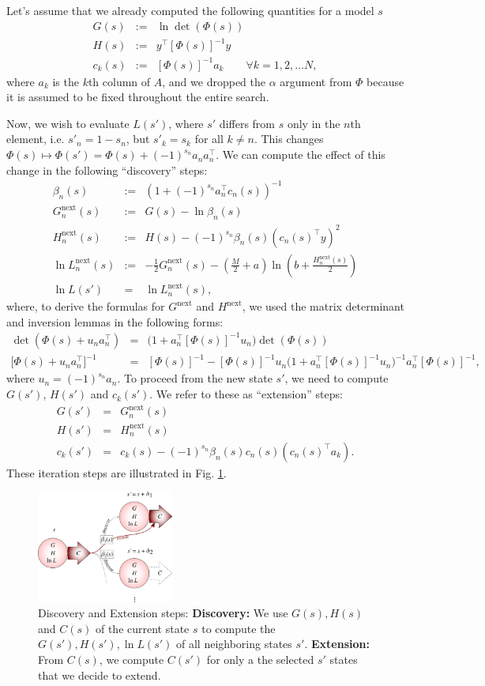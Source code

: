 \documentclass[letter,10pt,oneside]{article}
\newcommand{\bal}{\begin{eqnarray}}
\newcommand{\eal}{\end{eqnarray}}
\newcommand{\ba}{\begin{eqnarray*}}
\newcommand{\ea}{\end{eqnarray*}}
\newcommand{\+}{^\dagger}
\newcommand{\T}{^\top}
\newcommand{\reffig}[1]{Fig. \ref{#1}}
\begin{document}
Let's assume that we already computed the following quantities for a model $s$
\ba
  G(s) &:=& \ln \det(\Phi(s)) \\
  H(s) &:=& y\T [\Phi(s)]^{-1} y \\
  c_k(s) &:=& [\Phi(s)]^{-1} a_k  \qquad \forall k = 1,2,\ldots N,
\ea
where $a_k$ is the $k$th column of $A$, and we dropped the $\alpha$ argument from $\Phi$ because it is assumed to be fixed throughout the entire search.

Now, we wish to evaluate $L(s')$, where $s'$ differs from $s$ only in the $n$th element, i.e. $s'_n = 1-s_n$, but $s'_k = s_k$ for all $k \neq n$. This changes $\Phi(s) \mapsto \Phi(s') = \Phi(s) + (-1)^{s_n}a_n a_n\T$. We can compute the effect of this change in the following ``discovery'' steps:
\bal
  \label{eq:beta_n}
  \beta_n(s) &:=& \left(1 + (-1)^{s_n} a_n\T c_n(s)\right)^{-1} \\
  \label{eq:Gnext_n}
  G^\text{next}_{n}(s) &:=& G(s) - \ln \beta_n(s) \\
  \label{eq:Hnext_n}
  H^\text{next}_{n}(s) &:=& H(s) - (-1)^{s_n}\beta_n(s) \left(c_n(s)\T y\right)^2 \\
  \ln L^\text{next}_n(s) &:=& -\frac{1}{2} G^\text{next}_{n}(s) - \left(\frac{M}{2} + a\right)\ln\left(b + \frac{H^\text{next}_{n}(s)}{2}\right) \\
  \ln L(s') &=& \ln L^\text{next}_n(s), \nonumber
\eal
where, to derive the formulas for $G^\text{next}$ and $H^\text{next}$, we used the matrix determinant and inversion lemmas in the following forms:
\ba
  \det \left(\Phi(s) + u_n a_n\T \right) &=& \Big(1 + a_n\T[\Phi(s)]^{-1} u_n \Big)\det (\Phi(s)) \\
  \Big[\Phi(s) + u_n a_n\T \Big]^{-1} &=& [\Phi(s)]^{-1} - [\Phi(s)]^{-1}u_n \Big(1 + a_n\T [\Phi(s)]^{-1}u_n\Big)^{-1}a_n\T [\Phi(s)]^{-1},
\ea
where $u_n = (-1)^{s_n} a_n$.
To proceed from the new state $s'$, we need to compute $G(s')$, $H(s')$ and $c_k(s')$. We refer to these as ``extension'' steps:
\bal
  G(s') &=& G_n^\text{next}(s) \nonumber\\
  H(s') &=& H_n^\text{next}(s) \nonumber\\
  c_k(s') &=& c_k(s) - (-1)^{s_n} \beta_n(s) c_n(s) \left(c_n(s)\T a_k\right).
\eal
These iteration steps are illustrated in \reffig{fig:iteration}.
\begin{figure}[h]
  \centering
  \includegraphics[width=0.4\textwidth]{figs/iteration.pdf}
  \caption{
    \label{fig:iteration}
    Discovery and Extension steps: {\bf Discovery:} We use $G(s), H(s)$ and $C(s)$ of the current state $s$ to compute the $G(s'), H(s'), \ln L(s')$ of all neighboring states $s'$. {\bf Extension:} From $C(s)$, we compute $C(s')$ for only a the selected $s'$ states that we decide to extend.
  }
\end{figure}
\end{document}
